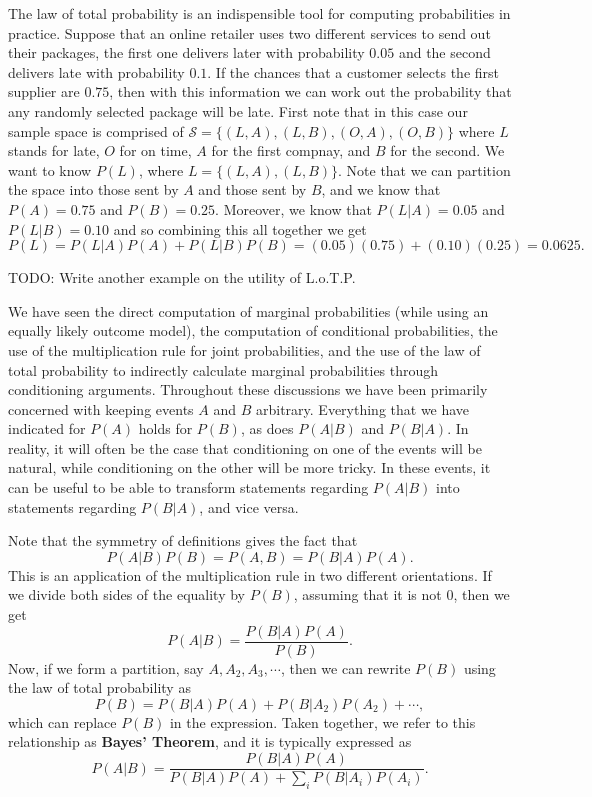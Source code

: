 \documentclass[
  letterpaper,
  DIV=11,
  numbers=noendperiod]{scrreprt}
\begin{document}
The law of total probability is an indispensible tool for computing
probabilities in practice. Suppose that an online retailer uses two
different services to send out their packages, the first one delivers
later with probability \(0.05\) and the second delivers late with
probability \(0.1\). If the chances that a customer selects the first
supplier are \(0.75\), then with this information we can work out the
probability that any randomly selected package will be late. First note
that in this case our sample space is comprised of
\(\mathcal{S} = \{(L,A),(L,B),(O,A),(O,B)\}\) where \(L\) stands for
late, \(O\) for on time, \(A\) for the first compnay, and \(B\) for the
second. We want to know \(P(L)\), where \(L = \{(L,A),(L,B)\}\). Note
that we can partition the space into those sent by \(A\) and those sent
by \(B\), and we know that \(P(A) = 0.75\) and \(P(B) = 0.25\).
Moreover, we know that \(P(L|A) = 0.05\) and \(P(L|B) = 0.10\) and so
combining this all together we get
\[P(L) = P(L|A)P(A) + P(L|B)P(B) = (0.05)(0.75) + (0.10)(0.25) = 0.0625.\]

TODO: Write another example on the utility of L.o.T.P.

We have seen the direct computation of marginal probabilities (while
using an equally likely outcome model), the computation of conditional
probabilities, the use of the multiplication rule for joint
probabilities, and the use of the law of total probability to indirectly
calculate marginal probabilities through conditioning arguments.
Throughout these discussions we have been primarily concerned with
keeping events \(A\) and \(B\) arbitrary. Everything that we have
indicated for \(P(A)\) holds for \(P(B)\), as does \(P(A|B)\) and
\(P(B|A)\). In reality, it will often be the case that conditioning on
one of the events will be natural, while conditioning on the other will
be more tricky. In these events, it can be useful to be able to
transform statements regarding \(P(A|B)\) into statements regarding
\(P(B|A)\), and vice versa.

Note that the symmetry of definitions gives the fact that
\[P(A|B)P(B) = P(A,B) = P(B|A)P(A).\] This is an application of the
multiplication rule in two different orientations. If we divide both
sides of the equality by \(P(B)\), assuming that it is not \(0\), then
we get \[P(A|B) = \frac{P(B|A)P(A)}{P(B)}.\] Now, if we form a
partition, say \(A,A_2,A_3,\cdots\), then we can rewrite \(P(B)\) using
the law of total probability as
\[P(B) =  P(B|A)P(A) + P(B|A_2)P(A_2) + \cdots,\] which can replace
\(P(B)\) in the expression. Taken together, we refer to this
relationship as \textbf{Bayes' Theorem}, and it is typically expressed
as \[P(A|B) = \frac{P(B|A)P(A)}{P(B|A)P(A) + \sum_i P(B|A_i)P(A_i)}.\]
\end{document}
